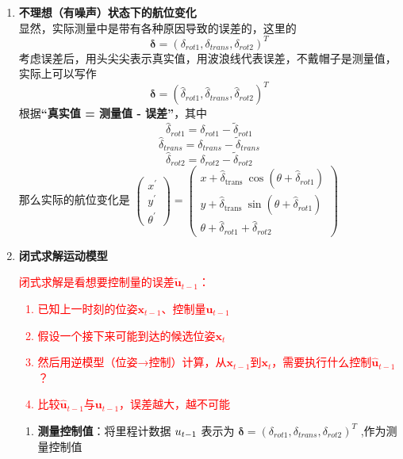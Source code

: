 \documentclass[../main.tex]{subfiles}
\begin{document}
\begin{enumerate}
\begin{enumerate}
        \item \textbf{不理想（有噪声）状态下的航位变化}\\
        显然，实际测量中是带有各种原因导致的误差的，这里的$$\boldsymbol{\delta} = (\delta_{rot1}, \delta_{trans}, \delta_{rot2})^T$$
        考虑误差后，用头尖尖表示真实值，用波浪线代表误差，不戴帽子是测量值，实际上可以写作
        $$\boldsymbol{\delta} = ({\widehat{\delta }}_{rot1},{\widehat{\delta }}_{trans}, {\widehat{\delta }}_{rot2})^T$$
        根据\textbf{“真实值 = 测量值 - 误差”}，其中
        $${\widehat{\delta }}_{rot1} = {\delta }_{rot1} - {\widetilde{\delta }}_{rot1}$$
        $${\widehat{\delta }}_{trans} = {\delta }_{trans} - {\widetilde{\delta }}_{trans}$$
        $${\widehat{\delta }}_{rot2} = {\delta }_{rot2} - {\widetilde{\delta }}_{rot2} $$
        那么实际的航位变化是
        \( \left( \begin{array}{l} {x}^{\prime } \\  {y}^{\prime } \\  {\theta }^{\prime } \end{array}\right)  = \left( \begin{matrix} x + {\widehat{\delta }}_{\text{trans }}\cos \left( {\theta  + {\widehat{\delta }}_{rot1}}\right) \\  y + {\widehat{\delta }}_{\text{trans }}\sin \left( {\theta  + {\widehat{\delta }}_{rot1}}\right) \\  \theta  + {\widehat{\delta }}_{rot1} + {\widehat{\delta }}_{rot2} \end{matrix}\right) \)
                \item \textbf{闭式求解运动模型}\\
            {\small\kaishu \textcolor{red}{闭式求解是看想要控制量的误差$\widetilde{\mathbf{u}}_{t-1}$：
            \begin{enumerate}
                \item 已知上一时刻的位姿$\mathbf{x}_{t-1}$、控制量$\mathbf{u}_{t-1}$
                \item 假设一个接下来可能到达的候选位姿$\mathbf{x}_t$
                \item 然后用逆模型（位姿→控制）计算，从$\mathbf{x}_{t-1}$到$\mathbf{x}_{t}$，需要执行什么控制$\widehat{\mathbf{u}}_{t-1}$？
                \item 比较$\widehat{\mathbf{u}}_{t-1}$与$\mathbf{u}_{t-1}$，误差越大，越不可能
            \end{enumerate}
            }}
            \begin{enumerate}
                \item \textbf{测量控制值}：将里程计数据 \( {\mathbf\mathbf{u}}_{t - 1} \) 表示为 \( \mathbf{\delta } = {\left( {\delta }_{rot1},{\delta }_{trans},{\delta }_{rot2}\right) }^{T} \) ,作为测量控制值

\end{enumerate}
\end{enumerate}
\end{enumerate}
\end{document}

